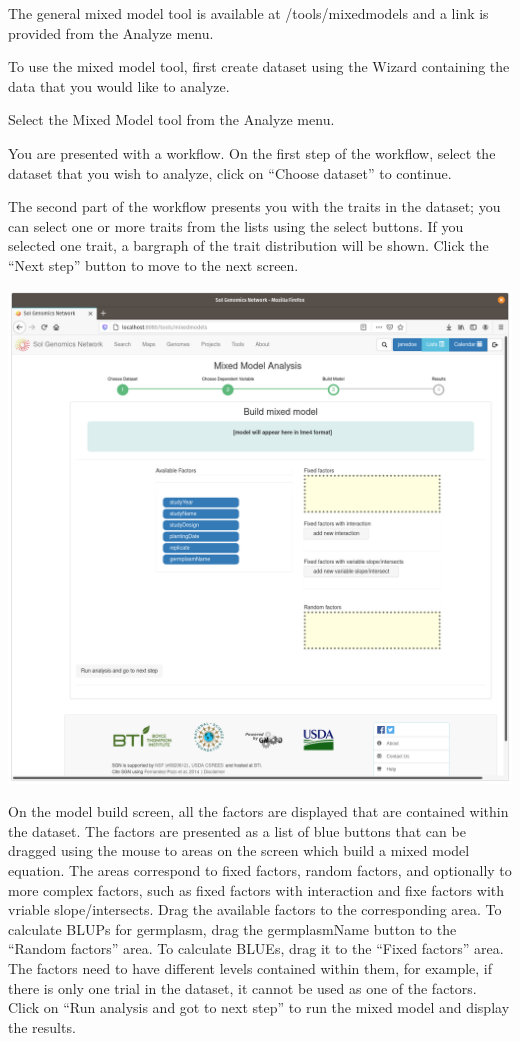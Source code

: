 \documentclass[
  12pt,
]{book}
\begin{document}
The general mixed model tool is available at /tools/mixedmodels and a link is provided from the Analyze menu.

To use the mixed model tool, first create dataset using the Wizard containing the data that you would like to analyze.

Select the Mixed Model tool from the Analyze menu.

You are presented with a workflow. On the first step of the workflow, select the dataset that you wish to analyze, click on ``Choose dataset'' to continue.

The second part of the workflow presents you with the traits in the dataset; you can select one or more traits from the lists using the select buttons. If you selected one trait, a bargraph of the trait distribution will be shown. Click the ``Next step'' button to move to the next screen.

\begin{center}\includegraphics[width=0.95\linewidth]{assets/images/mixedmodel_tool_model_build_step} \end{center}

On the model build screen, all the factors are displayed that are contained within the dataset. The factors are presented as a list of blue buttons that can be dragged using the mouse to areas on the screen which build a mixed model equation. The areas correspond to fixed factors, random factors, and optionally to more complex factors, such as fixed factors with interaction and fixe factors with vriable slope/intersects. Drag the available factors to the corresponding area. To calculate BLUPs for germplasm, drag the germplasmName button to the ``Random factors'' area. To calculate BLUEs, drag it to the ``Fixed factors'' area. The factors need to have different levels contained within them, for example, if there is only one trial in the dataset, it cannot be used as one of the factors. Click on ``Run analysis and got to next step'' to run the mixed model and display the results.
\end{document}
